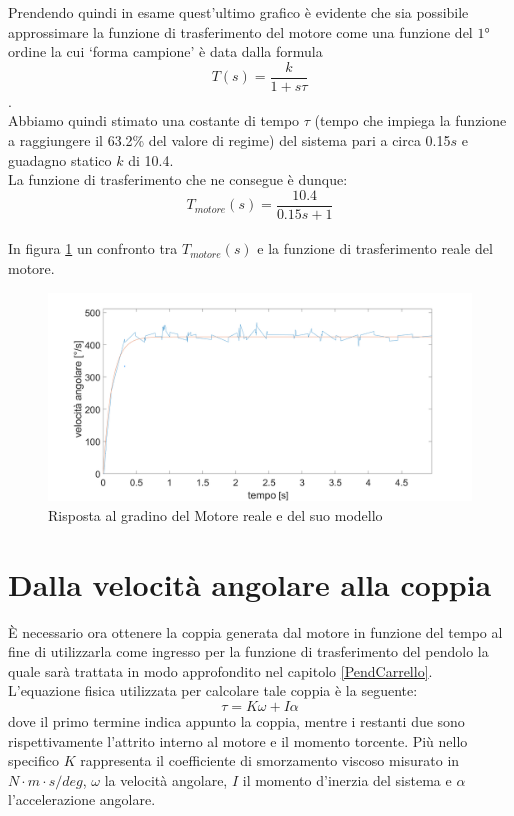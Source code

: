 Prendendo quindi in esame quest'ultimo grafico è evidente che sia possibile approssimare la funzione di trasferimento del motore come una funzione del $\ang{1}$ ordine la cui `forma campione' è data dalla formula $$T(s)=\displaystyle\frac{k}{1+s\tau}$$. \\
Abbiamo quindi stimato una costante di tempo $\tau$ (tempo che impiega la funzione a raggiungere il 63.2\% del valore di regime) del sistema pari a circa 0.15$s$ e guadagno statico $k$ di 10.4.\\
La funzione di trasferimento che ne consegue è dunque:
\\
$$
T_{motore}(s)=\displaystyle\frac{10.4}{0.15s+1}
$$
\\
In figura \ref{modMotorvsReale} un confronto tra $T_{motore}(s)$ e la funzione di trasferimento reale del motore.
\begin{figure}[ht]
	\centering
	\includegraphics[width=\textwidth]{modMotorvsReale.png}
	\caption{Risposta al gradino del Motore reale e del suo modello}
	\label{modMotorvsReale}
\end{figure}

\section{Dalla velocità angolare alla coppia}
È necessario ora ottenere la coppia generata dal motore in funzione del tempo al fine di utilizzarla come ingresso per la funzione di trasferimento del pendolo la quale sarà trattata in modo approfondito nel capitolo \ref{PendCarrello}.\\
L'equazione fisica utilizzata per calcolare tale coppia è la seguente:
$$
\tau=K\omega+I\alpha
$$
dove il primo termine indica appunto la coppia, mentre i restanti due sono rispettivamente l'attrito interno al motore e il momento torcente.
Più nello specifico $K$ rappresenta il coefficiente di smorzamento viscoso misurato in $N\cdot m\cdot s/deg$, $\omega$ la velocità angolare, $I$ il momento d'inerzia del sistema e $\alpha$ l'accelerazione angolare.

